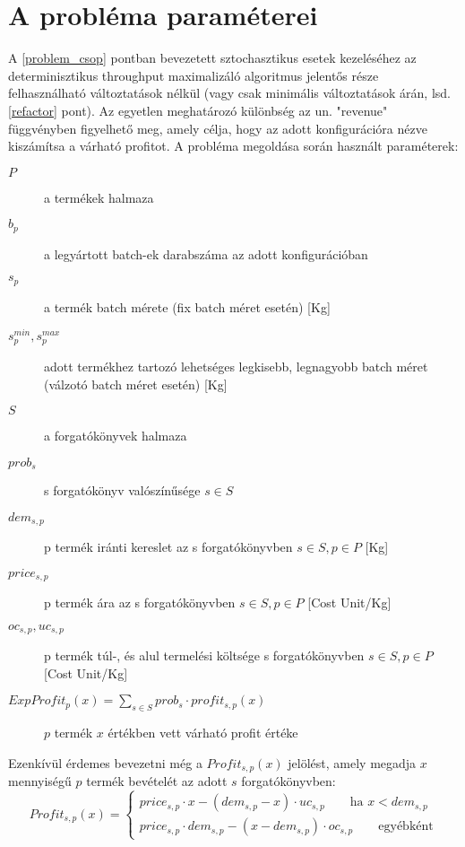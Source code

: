 \section{A probléma paraméterei} \label{problem_parameters}
A \ref{problem_csop} pontban bevezetett sztochasztikus esetek kezeléséhez az determinisztikus throughput maximalizáló algoritmus jelentős része felhasználható változtatások nélkül (vagy csak minimális változtatások árán, lsd. \ref{refactor} pont).
Az egyetlen meghatározó különbség az un. "revenue" függvényben figyelhető meg, amely célja, hogy az adott konfigurációra nézve kiszámítsa a várható profitot.
A probléma megoldása során használt paraméterek:
\begin {description}
\item[$P$]  a termékek halmaza
\item[$b_p$]  a legyártott batch-ek darabszáma az adott konfigurációban
\item[$s_p$]  a termék batch mérete (fix batch méret esetén) [Kg]
\item[$s_p^{min},s_p^{max}$]  adott termékhez tartozó lehetséges legkisebb, legnagyobb batch méret (válzotó batch méret esetén) [Kg]
\item[$S$]  a forgatókönyvek halmaza
\item[$prob_s$]  s forgatókönyv valószínűsége $s	\in S$
\item[$dem_{s,p}$]  p termék iránti kereslet az s forgatókönyvben $s	\in S, p	\in P$ [Kg]
\item[$price_{s,p}$]  p termék ára az s forgatókönyvben $s	\in S, p	\in P$ [Cost Unit/Kg]
\item[$oc_{s,p}, uc_{s,p}$]  p termék túl-, és alul termelési költsége s forgatókönyvben $s	\in S, p	\in P$ [Cost Unit/Kg]
\item[$ExpProfit_p(x)=\sum_{s \in S}prob_s \cdot profit_{s,p}(x)$]  $p$ termék $x$ értékben vett várható profit értéke
\end {description}
Ezenkívül érdemes bevezetni még a $Profit_{s,p}(x)$ jelölést, amely megadja $x$ mennyiségű $p$ termék bevételét az adott $s$ forgatókönyvben:
\begin{equation*}
Profit_{s,p}(x)= \begin{cases}
            price_{s,p}\cdot x-(dem_{s,p}-x) \cdot uc_{s,p}\qquad \text{ha } x<dem_{s,p} \\
            price_{s,p} \cdot dem_{s,p}-(x-dem_{s,p}) \cdot oc_{s,p}\qquad \text{egyébként}
       \end{cases}
\end{equation*}\\
